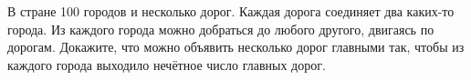 \begin{problems}
\item В стране 100 городов и несколько дорог. Каждая дорога соединяет два каких-то города. Из каждого города можно добраться до любого другого, двигаясь по дорогам. Докажите, что можно объявить несколько дорог главными так, чтобы из каждого города выходило нечётное число главных дорог.








\end{problems}